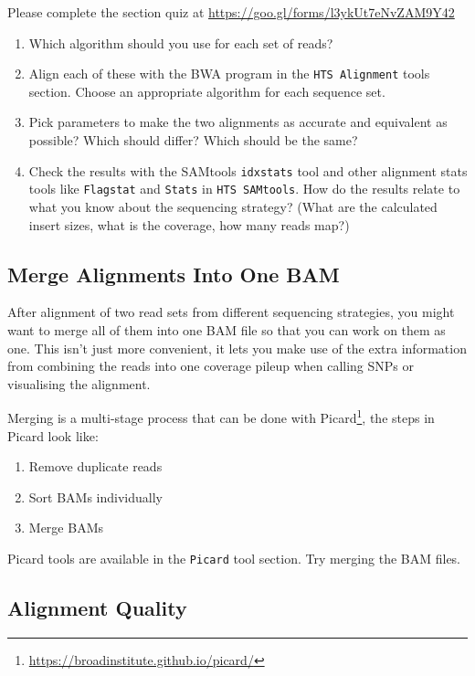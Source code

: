 \documentclass[12pt,]{book}
\providecommand{\tightlist}{%
  \setlength{\itemsep}{0pt}\setlength{\parskip}{0pt}}
\let\rmarkdownfootnote\footnote%
\def\footnote{\protect\rmarkdownfootnote}
\renewcommand{\href}[2]{#2\footnote{\url{#1}}}
\theoremstyle{definition}
\theoremstyle{definition}
\theoremstyle{remark}
\begin{document}
Please complete the section quiz at
\url{https://goo.gl/forms/l3ykUt7eNvZAM9Y42}

\begin{enumerate}
\def\labelenumi{\arabic{enumi}.}
\tightlist
\item
  Which algorithm should you use for each set of reads?
\item
  Align each of these with the BWA program in the
  \texttt{HTS\ Alignment} tools section. Choose an appropriate algorithm
  for each sequence set.
\item
  Pick parameters to make the two alignments as accurate and equivalent
  as possible? Which should differ? Which should be the same?
\item
  Check the results with the SAMtools \texttt{idxstats} tool and other
  alignment stats tools like \texttt{Flagstat} and \texttt{Stats} in
  \texttt{HTS\ SAMtools}. How do the results relate to what you know
  about the sequencing strategy? (What are the calculated insert sizes,
  what is the coverage, how many reads map?)
\end{enumerate}

\subsection{Merge Alignments Into One
BAM}\label{merge-alignments-into-one-bam}

After alignment of two read sets from different sequencing strategies,
you might want to merge all of them into one BAM file so that you can
work on them as one. This isn't just more convenient, it lets you make
use of the extra information from combining the reads into one coverage
pileup when calling SNPs or visualising the alignment.

Merging is a multi-stage process that can be done with
\href{https://broadinstitute.github.io/picard/}{Picard}, the steps in
Picard look like:

\begin{enumerate}
\def\labelenumi{\arabic{enumi}.}
\tightlist
\item
  Remove duplicate reads
\item
  Sort BAMs individually
\item
  Merge BAMs
\end{enumerate}

Picard tools are available in the \texttt{Picard} tool section. Try
merging the BAM files.

\subsection{Alignment Quality}\label{alignment-quality}
\end{document}
